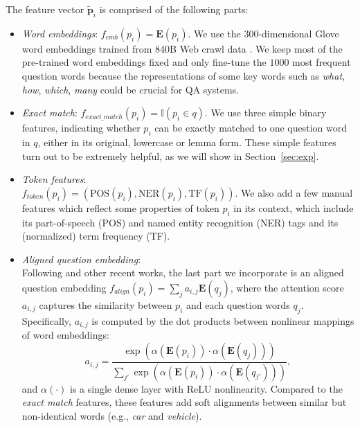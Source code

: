 \documentclass[11pt,a4paper]{article}
\begin{document}
The feature vector $\tilde{\mathbf{p}}_i$ is comprised of the following parts:
\begin{itemize}
    \item
\emph{Word embeddings}: $f_{emb}(p_i) = \mathbf{E}(p_i)$. We use the 300-dimensional Glove word embeddings trained from 840B Web crawl data \cite{pennington2014glove}. We keep most of the pre-trained word embeddings fixed and only fine-tune the $1000$ most frequent question words because the representations of some key words such as \textit{what}, \textit{how}, \textit{which}, \textit{many} could be crucial for QA systems.
    \item
\emph{Exact match}: $f_{exact\_match}(p_i) = \mathbb{I}(p_i \in q)$. We use three simple binary features, indicating whether $p_i$ can be exactly matched to one question word in $q$, either in its original, lowercase or lemma form. These simple features turn out to be extremely helpful, as we will show in Section~\ref{sec:exp}.
    \item
\emph{Token features}: \\ $f_{token}(p_i) = (\text{POS}(p_i), \text{NER}(p_i), \text{TF}(p_i))$. We also add a few manual features which reflect some properties of token $p_i$ in its context, which include its part-of-speech (POS) and named entity recognition (NER) tags and its (normalized) term frequency (TF).
    \item
\emph{Aligned question embedding}: \\ Following \cite{lee2016learning} and other recent works, the last part we incorporate is an aligned question embedding $f_{align}(p_i) = \sum_j{a_{i, j} \mathbf{E}(q_j)}$, where the attention score $a_{i, j}$ captures the similarity between $p_i$ and each question words $q_j$. Specifically, $a_{i, j}$ is computed by the dot products between nonlinear mappings of word embeddings: 
    \begin{equation*}
    	a_{i, j} = \frac{\exp\left(\alpha(\mathbf{E}(p_i)) \cdot \alpha(\mathbf{E}(q_{j}))\right)}{\sum_{j'}{\exp\left(\alpha(\mathbf{E}(p_i)) \cdot \alpha(\mathbf{E}(q_{j'}))\right)}},
    \end{equation*} and $\alpha(\cdot)$ is a single dense layer with ReLU nonlinearity. Compared to the \emph{exact match} features, these features add soft alignments between similar but non-identical words (e.g., \textit{car} and \textit{vehicle}).
\end{itemize}
\end{document}

